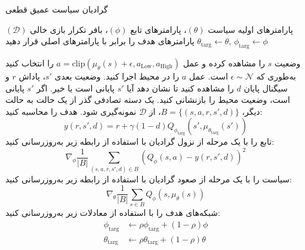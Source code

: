         
%        
        
        
        \begin{algorithm}[H]
        	\caption{گرادیان سیاست عمیق قطعی}\label{alg:DDPG}
        	\begin{algorithmic}[1]
   پارامترهای اولیه سیاست
$(\theta)$، پارامترهای تابع
$(\phi)$، بافر تکرار بازی خالی $(\mathcal{D})$
\State پارامترهای هدف را برابر با پارامترهای اصلی قرار دهید
$\theta_{\text{targ}} \leftarrow \theta$, $\phi_{\text{targ}} \leftarrow \phi$

\State 
وضعیت 
\(s\)
 را مشاهده کرده و عمل $a = \text{clip}(\mu_{\theta}(s) + \epsilon, a_{\text{Low}}, a_{\text{High}})$ را انتخاب کنید به‌طوری که $\epsilon \sim \mathcal{N}$ است.
\State عمل $a$ را در محیط اجرا کنید.
\State وضعیت بعدی $s'$، پاداش $r$ و سیگنال پایان $d$ را مشاهده کنید تا نشان دهد آیا $s'$ پایانی است یا خیر.
\State اگر $s'$ پایانی است، وضعیت محیط را بازنشانی کنید.
\State یک دسته تصادفی گذر از ‌یک حالت به حالت دیگر، $B = \{ (s,a,r,s',d) \}$، از $\mathcal{D}$ نمونه‌گیری شود.
\State
هدف را محاسبه کنید:
\[ y(r,s',d) = r + \gamma (1-d) Q_{\phi_{\text{targ}}}(s', \mu_{\theta_{\text{targ}}}(s')) \]
\State تابع  را با یک مرحله از نزول گرادیان با استفاده از رابطه زیر به‌روزرسانی کنید:
\[ \nabla_{\phi} \frac{1}{|B|}\sum_{(s,a,r,s',d) \in B} \left( Q_{\phi}(s,a) - y(r,s',d) \right)^2 \]
\State سیاست را با یک مرحله از صعود گرادیان با استفاده از رابطه زیر به‌روزرسانی کنید:
\[ \nabla_{\theta} \frac{1}{|B|}\sum_{s \in B}Q_{\phi}(s, \mu_{\theta}(s)) \]
\State شبکه‌های هدف را با استفاده از معادلات زیر به‌روزرسانی کنید:
\begin{align*}
	\phi_{\text{targ}} &\leftarrow \rho \phi_{\text{targ}} + (1-\rho) \phi \\
	\theta_{\text{targ}} &\leftarrow \rho \theta_{\text{targ}} + (1-\rho) \theta
\end{align*}
\EndFor
\EndIf
\EndWhile
        	\end{algorithmic}
        \end{algorithm}
        
     


